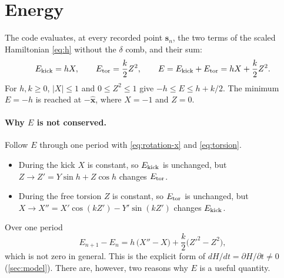 \documentclass[11pt,a4paper]{article}
\newcommand{\vs}{\bm{s}}
\begin{document}
\section{Energy}\label{sec:energy}

The code evaluates, at every recorded point $\vs_n$, the two terms of the scaled Hamiltonian \eqref{eq:h} without the
$\delta$ comb, and their sum:
\begin{equation}\label{eq:energy}
  E_{\rm kick} = hX, \qquad E_{\rm tor} = \frac{k}{2}Z^2, \qquad E = E_{\rm kick} + E_{\rm tor} = hX + \frac{k}{2}Z^2 .
\end{equation}
For $h, k \ge 0$, $|X|\le1$ and $0\le Z^2\le1$ give $-h \le E \le h + k/2$. The minimum $E = -h$ is reached at
$-\hat{\bm x}$, where $X=-1$ and $Z=0$.

\paragraph{Why $E$ is not conserved.} Follow $E$ through one period with \eqref{eq:rotation-x} and \eqref{eq:torsion}.
\begin{itemize}
  \item During the kick $X$ is constant, so $E_{\rm kick}$ is unchanged, but $Z \to Z' = Y\sin h + Z\cos h$
  changes $E_{\rm tor}$.
  \item During the free torsion $Z$ is constant, so $E_{\rm tor}$ is unchanged, but $X \to X'' = X'\cos(kZ') -
  Y'\sin(kZ')$ changes $E_{\rm kick}$.
\end{itemize}
Over one period
\begin{equation*}
  E_{n+1} - E_n = h\,\big(X'' - X\big) + \frac k2\big(Z'^2 - Z^2\big),
\end{equation*}
which is not zero in general. This is the explicit form of $dH/dt = \partial H/\partial t \ne 0$
(\cref{sec:model}). There are, however, two reasons why $E$ is a useful quantity.
\end{document}
